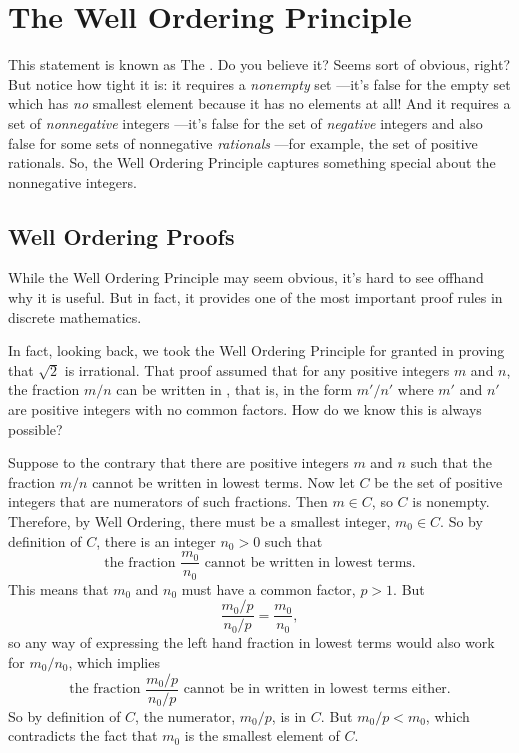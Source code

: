 \chapter{The Well Ordering Principle}\label{well_ordering_chap}


This statement is known as The .  Do you
believe it?  Seems sort of obvious, right?  But notice how tight it is: it
requires a \emph{nonempty} set ---it's false for the empty set which has
\emph{no} smallest element because it has no elements at all!  And it
requires a set of \emph{nonnegative} integers ---it's false for the set of
\emph{negative} integers and also false for some sets of nonnegative
\emph{rationals} ---for example, the set of positive rationals.  So, the
Well Ordering Principle captures something special about the nonnegative
integers.

\section{Well Ordering Proofs}

While the Well Ordering Principle may seem obvious, \iffalse it looks
nothing like the induction axiom, and\fi it's hard to see offhand why it
is useful.  But in fact, it provides one of the most important proof rules
in discrete mathematics.  \iffalse We'll explain this after we introduce a
template for well ordering principle proofs resembling the template in
Section~\ref{templ-induct-proofs} for a proof by strong induction.\fi

In fact, looking back, we took the Well Ordering Principle for granted in
proving that $\sqrt{2}$ is irrational.  That proof assumed that for any
positive integers $m$ and $n$, the fraction $m/n$ can be written in
, that is, in the form $m'/n'$ where $m'$ and $n'$
are positive integers with no common factors.  How do we know this is
always possible?

Suppose to the contrary that there are positive integers $m$ and $n$
such that the fraction $m/n$ cannot be written in lowest terms.  Now
let $C$ be the set of positive integers that are numerators of such
fractions.  Then $m \in C$, so $C$ is nonempty.  Therefore, by Well
Ordering, there must be a smallest integer, $m_0 \in C$.  So by
definition of $C$, there is an integer $n_0 > 0$ such that
\[
\text{the fraction } \frac{m_0}{n_0} \text{ cannot be written in lowest
terms.}
\]
This means that $m_0$ and $n_0$ must have a common factor, $p>1$.  But
\[
\frac{m_0/p}{n_0/p} = \frac{m_0}{n_0},
\]
so any way of expressing the left hand fraction in lowest terms would also
work for $m_0/n_0$, which implies
\[
\text{the fraction } \frac{m_0/p}{n_0/p} \text{ cannot be in written in
lowest terms either.}
\]
So by definition of $C$, the numerator, $m_0/p$, is in $C$.  But $m_0/p <
m_0$, which contradicts the fact that $m_0$ is the smallest element of $C$.

